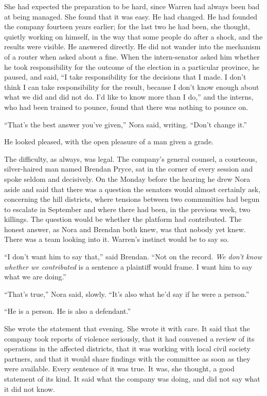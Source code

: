 She had expected the preparation to be hard, since Warren had always been bad at being managed. She found that it was easy. He had changed. He had founded the company fourteen years earlier; for the last two he had been, she thought, quietly working on himself, in the way that some people do after a shock, and the results were visible. He answered directly. He did not wander into the mechanism of a router when asked about a fine. When the intern-senator asked him whether he took responsibility for the outcome of the election in a particular province, he paused, and said, ``I take responsibility for the decisions that I made. I don't think I can take responsibility for the result, because I don't know enough about what we did and did not do. I'd like to know more than I do,'' and the interns, who had been trained to pounce, found that there was nothing to pounce on.

``That's the best answer you've given,'' Nora said, writing. ``Don't change it.''

He looked pleased, with the open pleasure of a man given a grade.

The difficulty, as always, was legal. The company's general counsel, a courteous, silver-haired man named Brendan Pryce, sat in the corner of every session and spoke seldom and decisively. On the Monday before the hearing he drew Nora aside and said that there was a question the senators would almost certainly ask, concerning the hill districts, where tensions between two communities had begun to escalate in September and where there had been, in the previous week, two killings. The question would be whether the platform had contributed. The honest answer, as Nora and Brendan both knew, was that nobody yet knew. There was a team looking into it. Warren's instinct would be to say so.

``I don't want him to say that,'' said Brendan. ``Not on the record. \emph{We don't know whether we contributed} is a sentence a plaintiff would frame. I want him to say what we are doing.''

``That's true,'' Nora said, slowly. ``It's also what he'd say if he were a person.''

``He is a person. He is also a defendant.''

She wrote the statement that evening. She wrote it with care. It said that the company took reports of violence seriously, that it had convened a review of its operations in the affected districts, that it was working with local civil society partners, and that it would share findings with the committee as soon as they were available. Every sentence of it was true. It was, she thought, a good statement of its kind. It said what the company was doing, and did not say what it did not know.

